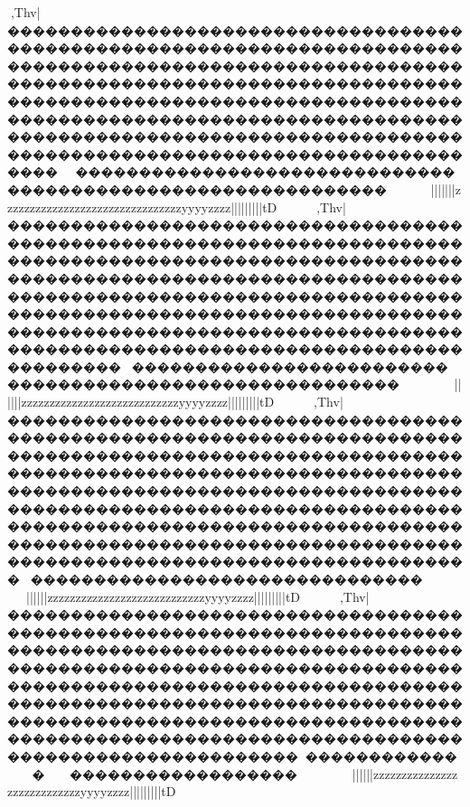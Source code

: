{{{{{{{{{{{{{{{{{{{{{{{{{{{{{{{{{{{{{{{{{{{{{{{{{{{{{{{{{{{{{{{{{{{{{{{{{{{{{{{{{{{{{{{{{{{{{{{{{{{{{{{{{{{{{{{{{{{{{{{{{{{{{{{{{{{{{{{{{{{{{{{{{{{{{{{{{{{{{{{{{{{{{{{{{{{{{{{{{{{{{{{{{{{{{{{{{{{{{{{{{{{{{{{{{{{{{{{{{{{{{{{{{{{{{{{{{{{{{{{{{{{{{{{{{{{{{{{{{{{{{{{{{{{{{{{{{{{{{{{{{{{{{{{{{{{{{{{{{{{{{{{{{{{{{{{{{{{{{{{{{{{{{{{{{{{{{{{{{{{{{{{{{{{{{{{{{{{{{{{{{{{{{{{{{{{{{{{{{{{{{{{{{{{{{{{{{{{{{{{{{{{{{{{{{{{{{{{{{{{{{{{{{{{{{{{{{{{{{{{{{{{{{{{{{{{{{{{{{{{{{{{{{{{{{{{{{{{{{{{{{{{{{{{{{{{{{{{{{{{{{{{{{{{{{{{{{{{{{{{{{{{{{{{{{{{{{{{{{{{{{{{{{{{{{{{{{{{{{{{{{{{{{{{{{{{{{{{{{{{{{{{{{{{{{{{{{{{{{{{{{{{{{{{{{{{{{{{{{{{{{{{{{{{{{{{{{{{{{{{{{{{{{{{{{{{{{{{{{{{{{{{{{{{{{{{,Thv|����������������������������������������������������������������������������������������������������������������������������������������������������������������������������������������������������������������������������������������������������������������������������������������������������������������������������������������������������������������~~~}}|}}}}}}}}||}||||{{{{{{{{zzzzzzzzzzzzzzzzzzzzzzzzzzzzzzzzyyyyzzzz{{{{{{{{{{{|||||||||}}}}}}}}}tD
,Thv|�����������������������������������������������������������������������������������������������������������������������������������������������������������������������������������������������������������������������������������������������������������������������������������������������������������������������������������������������������������������~~~~~~~}}}}}}}}}||}||||{{{{{{{{{{{{zzzzzzzzzzzzzzzzzzzzzzzzzzzzyyyyzzzz{{{{{{{{{{{|||||||||}}}}}}}}}tD
,Thv|��������������������������������������������������������������������������������������������������������������������������������������������������������������������������������������������������������������������������������������������������������������������������������������������������������������������������������������������������������������������~~~~~~~}}}}}}}}}||}||||{{{{{{{{{{{{zzzzzzzzzzzzzzzzzzzzzzzzzzzzyyyyzzzz{{{{{{{{{{{|||||||||}}}}}}}}}tD
,Thv|������������������������������������������������������������������������������������������������������������������������������������������������������������������������������������������������������������������������������������������������������������������������������������������������������������������������������������������������������~~~~~~~}}}}}}}}}||}||||{{{{{{{{{{{{zzzzzzzzzzzzzzzzzzzzzzzzzzzzyyyyzzzz{{{{{{{{{{{|||||||||}}}}}}}}}tD

}}}}}}}}}}}}}}}}}}}}}}}}}}}}}}}}}}}}}}}}}}}}}}}}}}}}}}}}}}}}}}}}}}}}}}}}}}}}}}}}}}}}}}}}}}}}}}}}}}}}}}}}}}}}}}}}}}}}}}}}}}}}}}}}}}}}}}}}}}}}}}}}}}}}}}}}}}}}}}}}}}}}}}}}}}}}}}}}}}}}}}}}}}}}}}}}}}}}}}}}}}}}}}}}}}}}}}}}}}}}}}}}}}}}}}}}}}}}}}}}}}}}}}}}}}}}}}}}}}}}}}}}}}}}}}}}}}}}}}}}}}}}}}}}}}}}}}}}}}}}}}}}}}}}}}}}}}}}}}}}}}}}}}}}}}}}}}}}}}}}}}}}}}}}}}}}}}}}}}}}}}}}}}}}}}}}}}}}}}}}}}}}}}}}}}}}}}}}}}}}}}}}}}}}}}}}}}}}}}}}}}}}}}}}}}}}}}}}}}}}}}}}}}}}}}}}}}}}}}}}}}}}}}}}}}}}}}}}}}}}}}}}}}}}}}}}}}}}}}}}}}}}}}}}}}}}}}}}}}}}}}}}}}}}}}}}}}}}}}}}}}}}}}}}}}}}}}}}}}}}}}}}}}}}}}}}}}}}}}}}}}}}}}}}}}}}}}}}}}}}}}}}}}}}}}}}}}}}}}}}}}}}}}}}}}}}}}}}}}}}}}}}}}}}}}}}}}}}}}}}}}}}}}}}}}}}}}}}}}}}}}
